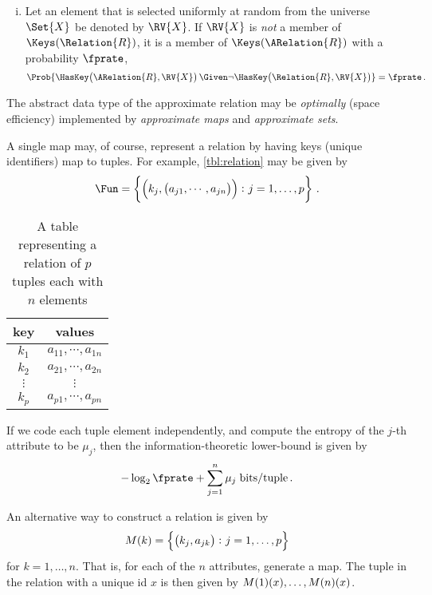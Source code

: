 \documentclass[ ../main.tex]{subfiles}
\begin{document}
\begin{definition}
\begin{enumerate}[(i)]
    \item Let an element that is selected uniformly at random from the universe $\Set{X}$ be denoted by $\RV{X}$. If $\RV{X}$ is \emph{not} a member of $\Keys(\Relation{R})$, it is a member of $\Keys(\ARelation{R})$ with a probability $\fprate$,
    \begin{equation}
        \Prob{\HasKey\!\left(\ARelation{R},\RV{X}\right) \Given \neg \HasKey\!\left(\Relation{R},\RV{X}\right)} = \fprate\,.
    \end{equation}
\end{enumerate}
\end{definition}




The abstract data type of the approximate relation may be \emph{optimally} (space efficiency) implemented by \emph{approximate maps} and \emph{approximate sets}.


A single map may, of course, represent a relation by having keys (unique identifiers) map to tuples. For example, \cref{tbl:relation} may be given by
\begin{equation}
    \Fun = \left\{
        \left(k_j, \left(a_{j 1}, \cdots, a_{j n}\right)\right) \colon j = 1,\ldots,p
    \right\}\,.
\end{equation}

\begin{table}[h]
\centering
\caption{A table representing a relation of $p$ tuples each with $n$ elements}
\label{tbl:relation_tuple_value}
\begin{tabular}{|c c|} 
\hline
key & values\\
\hline
    $k_1$ & $a_{1 1},\cdots,a_{1 n}$\\
    $k_2$ & $a_{2 1},\cdots,a_{2 n}$\\
    $\vdots$ & $\vdots$\\
    $k_p$ & $a_{p 1},\cdots,a_{p n}$\\
\hline
\end{tabular}
\end{table}

If we code each tuple element independently, and compute the entropy of the $j$-th attribute to be $\mu_j$, then the information-theoretic lower-bound is given by
\begin{equation}
    -\log_2 \fprate + \sum_{j=1}^{n} \mu_j \; \si{bits \per tuple}\,.
\end{equation}

An alternative way to construct a relation is given by
\begin{equation}
    M(k) =
    \left\{
        \left(k_j, a_{j k}\right) \colon j = 1,\ldots,p
    \right\}
\end{equation}
for $k=1,\ldots,n$. That is, for each of the $n$ attributes, generate a map. The tuple in the relation with a unique id $x$ is then given by $M(1)(x),\ldots,M(n)(x)$.
\end{document}

